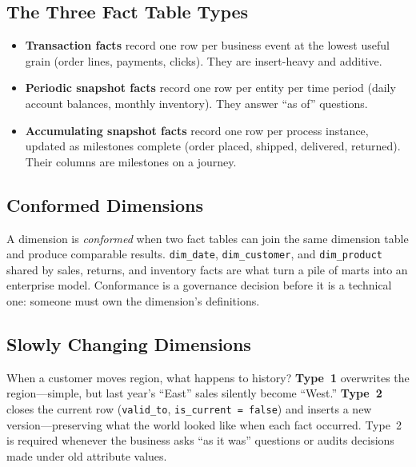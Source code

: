 \subsection{The Three Fact Table Types}
\begin{itemize}
    \item \textbf{Transaction facts} record one row per business event at the lowest useful grain (order lines, payments, clicks). They are insert-heavy and additive.
    \item \textbf{Periodic snapshot facts} record one row per entity per time period (daily account balances, monthly inventory). They answer ``as of'' questions.
    \item \textbf{Accumulating snapshot facts} record one row per process instance, updated as milestones complete (order placed, shipped, delivered, returned). Their columns are milestones on a journey.
\end{itemize}

\subsection{Conformed Dimensions}
A dimension is \emph{conformed} when two fact tables can join the same dimension table and produce comparable results. \texttt{dim\_date}, \texttt{dim\_customer}, and \texttt{dim\_product} shared by sales, returns, and inventory facts are what turn a pile of marts into an enterprise model. Conformance is a governance decision before it is a technical one: someone must own the dimension's definitions.

\subsection{Slowly Changing Dimensions}
When a customer moves region, what happens to history? \textbf{Type~1} overwrites the region---simple, but last year's ``East'' sales silently become ``West.'' \textbf{Type~2} closes the current row (\texttt{valid\_to}, \texttt{is\_current = false}) and inserts a new version---preserving what the world looked like when each fact occurred. Type~2 is required whenever the business asks ``as it was'' questions or audits decisions made under old attribute values.

